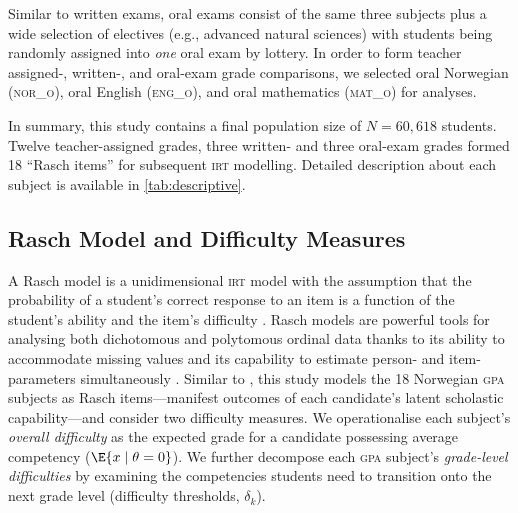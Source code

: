 Similar to written exams, oral exams consist of the same three subjects plus a wide selection of electives (e.g., advanced natural sciences) with students being randomly assigned into \emph{one} oral exam by lottery. In order to form teacher assigned-, written-, and oral-exam grade comparisons, we selected oral Norwegian (\textsc{nor\_o}), oral English (\textsc{eng\_o}), and oral mathematics (\textsc{mat\_o}) for analyses.

In summary, this study contains a final population size of $N = 60,618$ students. Twelve teacher-assigned grades, three written- and three oral-exam grades formed 18 ``Rasch items'' for subsequent \textsc{irt} modelling. Detailed description about each subject is available in \cref{tab:descriptive}.

\subsection{Rasch Model and Difficulty Measures}

A Rasch model is a unidimensional \textsc{irt} model with the assumption that the probability of a student's correct response to an item is a function of the student's ability and the item's difficulty \parencite{rasch:1960}. Rasch models are powerful tools for analysing both dichotomous and polytomous ordinal data thanks to its ability to accommodate missing values and its capability to estimate person- and item-parameters simultaneously \parencite{deayala:2022}. Similar to \textcite{he:2018}, this study models the 18 Norwegian \textsc{gpa} subjects as Rasch items---manifest outcomes of each candidate's latent scholastic capability---and consider two difficulty measures. We operationalise each subject's \emph{overall difficulty} as the expected grade for a candidate possessing average competency ($\E{x \mid \theta = 0}$). We further decompose each \textsc{gpa}  subject's \emph{grade-level difficulties} by examining the competencies students need to transition onto the next grade level (difficulty thresholds, $\delta_k$).

